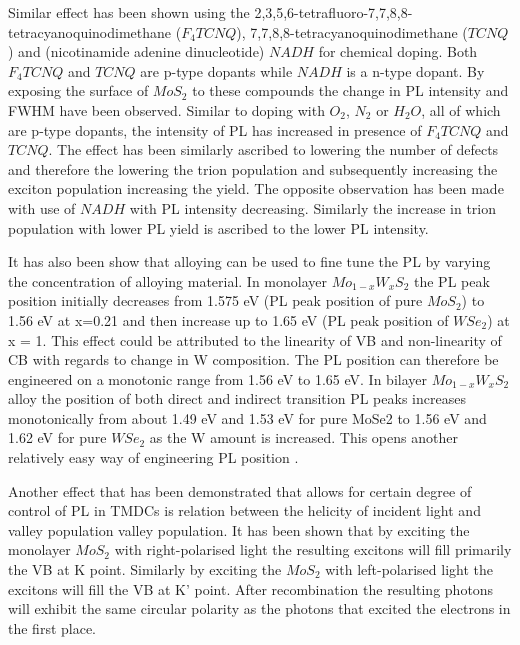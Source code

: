 	Similar effect has been shown using the 2,3,5,6-tetrafluoro-7,7,8,8-tetracyanoquinodimethane ($F_4TCNQ$), 7,7,8,8-tetracyanoquinodimethane ($TCNQ$) and (nicotinamide adenine dinucleotide) $NADH$ for chemical doping. Both $F_4TCNQ$ and $TCNQ$ are p-type dopants while $NADH$ is a n-type dopant. By exposing the surface of $MoS_2$ to these compounds the change in PL intensity and FWHM have been observed. Similar to doping with $O_2$, $N_2$ or $H_2O$, all of which are p-type dopants, the intensity of PL has increased in presence of $F_4TCNQ$ and $TCNQ$. The effect has been similarly ascribed to lowering the number of defects and therefore the lowering the trion population and subsequently increasing the exciton population increasing the yield. The opposite observation has been made with use of $NADH$ with PL intensity decreasing. Similarly the increase in trion population with lower PL yield is ascribed to the lower PL intensity. \cite{Mouri2013}
	
	It has also been show that alloying can be used to fine tune the PL by varying the concentration of alloying material. In monolayer $Mo_{1-x}W_xS_2$ the PL peak position initially decreases from 1.575 eV (PL peak position of pure $MoS_2$) to 1.56 eV at x=0.21 and then increase up to 1.65 eV (PL peak position of $WSe_2$) at x = 1. This effect could be attributed to the linearity of VB and non-linearity of CB with regards to change in W composition. The PL position can therefore be engineered on a monotonic range from 1.56 eV to 1.65 eV. In bilayer $Mo_{1-x}W_xS_2$ alloy the position of both direct and indirect transition PL peaks increases monotonically from about 1.49 eV and 1.53 eV for pure MoSe2 to 1.56 eV and 1.62 eV for pure $WSe_2$ as the W amount is increased. This opens another relatively easy way of engineering PL position \cite{Zhang2014}.
	
	Another effect that has been demonstrated that allows for certain degree of control of PL in TMDCs is relation between the helicity of incident light and valley population valley population. It has been shown that by exciting the monolayer $MoS_2$ with right-polarised light the resulting excitons will fill primarily the VB at K point. Similarly by exciting the $MoS_2$ with left-polarised light the excitons will fill the VB at K' point. After recombination the resulting photons will exhibit the same circular polarity as the photons that excited the electrons in the first place. \cite{Mak2012}\cite{Mak2012a}
	

